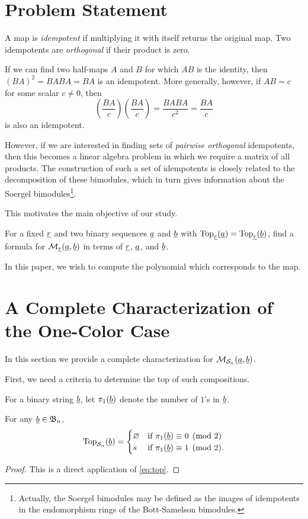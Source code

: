 \section{Problem Statement}
\label{sec:probstate}
\begin{definition}
	A map is \emph{idempotent} if multiplying it with itself returns the original map.  Two idempotents are \emph{orthogonal} if their product is zero.
\end{definition}
If we can find two half-maps $A$ and $B$ for which $AB$ is the identity, then $(BA)^2=BABA=BA$ is an idempotent.  More generally, however, if $AB = c$ for some scalar $c \neq 0$, then \[ \left( \frac{BA}{c} \right)\left( \frac{BA}{c} \right) = \frac{BABA}{c^2} = \frac{BA}{c} \] is also an idempotent.  

However, if we are interested in finding sets of \emph{pairwise orthogonal} idempotents, then this becomes a linear algebra problem in which we require a matrix of all products.  The construction of such a set of idempotents is closely related to the decomposition of these bimodules, which in turn gives information about the Soergel bimodules\footnote{Actually, the Soergel bimodules may be defined as the images of idempotents in the endomorphism rings of the Bott-Samelson bimodules.}.

This motivates the main objective of our study.
\begin{ques*}
	For a fixed $\underline{r}$ and two binary sequences $\underline{a}$ and $\underline{b}$ with $\operatorname{Top}_{\underline{r}}(\underline{a}) = \operatorname{Top}_{\underline{r}}(\underline{b})$, find a formula for $\mathcal M_{\underline{r}}(\underline{a}, \underline{b})$ in terms of $\underline{r}$, $\underline{a}$, and $\underline{b}$.
\end{ques*}
In this paper, we wish to compute the polynomial which corresponds to the map.

\section{A Complete Characterization of the One-Color Case}
\label{sec:res_onecolor}
In this section we provide a complete characterization for $\mathcal M_{\mathcal S_n}(\underline{a}, \underline{b})$.  %

First, we need a criteria to determine the top of such compositions.
\begin{definition}
	For a binary string $\underline{b}$, let $\pi_1(\underline{b})$ denote the number of $1$'s in $\underline{b}$.
\end{definition}
\begin{proposition}
	For any $\underline{b} \in \mathfrak B_n$, \[
		\operatorname{Top}_{\mathcal S_n}(\underline{b}) =
		\begin{cases}
			\varnothing & \text{if } \pi_1(\underline{b}) \equiv 0 \pmod{2} \\
			s & \text{if } \pi_1(\underline{b}) \equiv 1 \pmod{2}.
		\end{cases}
		\]
	\label{prop:s_top}
\end{proposition}
\begin{proof}
	This is a direct application of \eqref{eq:top}.
\end{proof}

